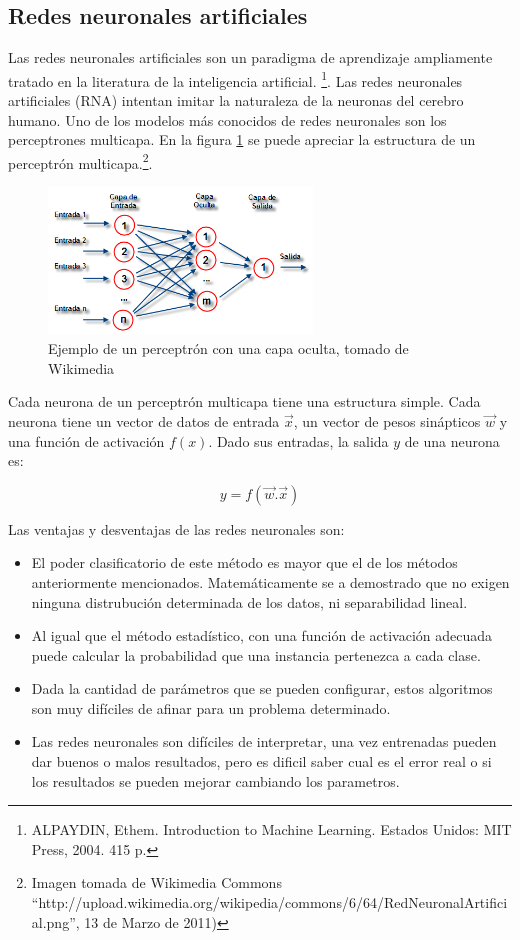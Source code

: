 \documentclass[a4paper, 11pt, oneside]{report}
\begin{document}
\subsection{Redes neuronales artificiales}

Las redes neuronales artificiales son un paradigma de aprendizaje ampliamente tratado en la literatura de la inteligencia artificial. \footnote{ALPAYDIN, Ethem. Introduction to Machine Learning. Estados Unidos: MIT Press, 2004. 415 p.}. Las redes neuronales artificiales (RNA) intentan imitar la naturaleza de la neuronas del cerebro humano. Uno de los modelos más conocidos de redes neuronales son los perceptrones multicapa. En la figura \ref{fig:rna} se puede apreciar la estructura de un perceptrón multicapa.\footnote{Imagen tomada de Wikimedia Commons ``http://upload.wikimedia.org/wikipedia/commons/6/64/RedNeuronalArtificial.png'', 13 de Marzo de 2011)}.

\begin{figure}[htb]
\begin{center}
\leavevmode
\includegraphics[width=7cm]{img/rna.png}
\end{center}
\caption{Ejemplo de un perceptrón con una capa oculta, tomado de Wikimedia}
\label{fig:rna}
\end{figure}

Cada neurona de un perceptrón multicapa tiene una estructura simple. Cada neurona tiene un vector de datos de entrada $\vec{x}$, un vector de pesos sinápticos $\vec{w}$ y una función de activación $f(x)$. Dado sus entradas, la salida $y$ de una neurona es:

\[y = f(\vec{w}.\vec{x})\]

Las ventajas y desventajas de las redes neuronales son:

\begin{itemize}
	\item El poder clasificatorio de este método es mayor que el de los métodos anteriormente mencionados. Matemáticamente se a demostrado que no exigen ninguna distrubución determinada de los datos, ni separabilidad lineal.
	\item Al igual que el método estadístico, con una función de activación adecuada puede calcular la probabilidad que una instancia pertenezca a cada clase.
	\item Dada la cantidad de parámetros que se pueden configurar, estos algoritmos son muy difíciles de afinar para un problema determinado.
	\item Las redes neuronales son difíciles de interpretar, una vez entrenadas pueden dar buenos o malos resultados, pero es dificil saber cual es el error real o si los resultados se pueden mejorar cambiando los parametros.
\end{itemize}
\end{document}
